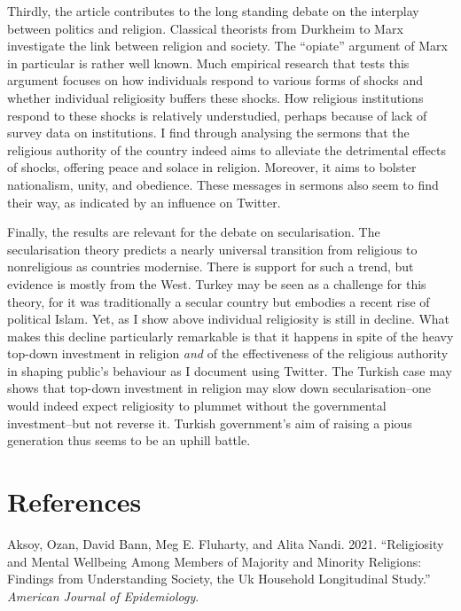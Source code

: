 \documentclass[
  12pt,
]{article}
\begin{document}
Thirdly, the article contributes to the long standing debate on the interplay between politics and religion. Classical theorists from Durkheim to Marx investigate the link between religion and society. The ``opiate'' argument of Marx in particular is rather well known. Much empirical research that tests this argument focuses on how individuals respond to various forms of shocks and whether individual religiosity buffers these shocks. How religious institutions respond to these shocks is relatively understudied, perhaps because of lack of survey data on institutions. I find through analysing the sermons that the religious authority of the country indeed aims to alleviate the detrimental effects of shocks, offering peace and solace in religion. Moreover, it aims to bolster nationalism, unity, and obedience. These messages in sermons also seem to find their way, as indicated by an influence on Twitter.

Finally, the results are relevant for the debate on secularisation. The secularisation theory predicts a nearly universal transition from religious to nonreligious as countries modernise. There is support for such a trend, but evidence is mostly from the West. Turkey may be seen as a challenge for this theory, for it was traditionally a secular country but embodies a recent rise of political Islam. Yet, as I show above individual religiosity is still in decline. What makes this decline particularly remarkable is that it happens in spite of the heavy top-down investment in religion \emph{and} of the effectiveness of the religious authority in shaping public's behaviour as I document using Twitter. The Turkish case may shows that top-down investment in religion may slow down secularisation--one would indeed expect religiosity to plummet without the governmental investment--but not reverse it. Turkish government's aim of raising a pious generation thus seems to be an uphill battle.

\hypertarget{references}{%
\section{References}\label{references}}

\linespread{1}

\hypertarget{refs}{}
\leavevmode\hypertarget{ref-aksoy2020religiosity}{}%
Aksoy, Ozan, David Bann, Meg E. Fluharty, and Alita Nandi. 2021. ``Religiosity and Mental Wellbeing Among Members of Majority and Minority Religions: Findings from Understanding Society, the Uk Household Longitudinal Study.'' \emph{American Journal of Epidemiology}.
\end{document}
